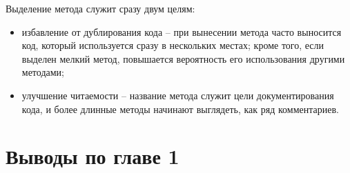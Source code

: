 Выделение метода служит сразу двум целям:
\begin{itemize}
    \item избавление от дублирования кода -- при вынесении метода часто выносится код, который используется сразу в нескольких местах;
    кроме того, если выделен мелкий метод, повышается вероятность его использования другими методами;
    \item улучшение читаемости -- название метода служит цели документирования кода,
    и более длинные методы начинают выглядеть, как ряд комментариев.
\end{itemize}
\lstset{
    language=Java,
    basicstyle=\small\ttfamily,
    frame=single,
    captionpos=b
}
\section*{Выводы по главе 1}
